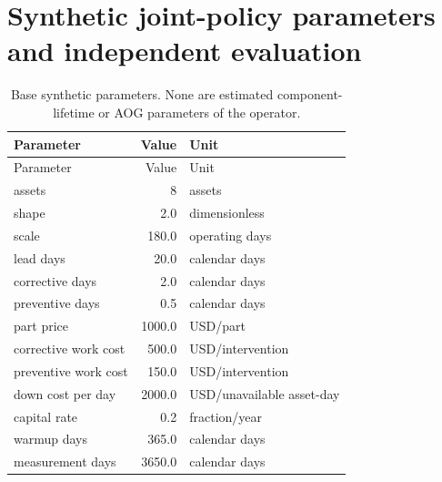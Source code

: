 \section{Synthetic joint-policy parameters and independent evaluation}

\begin{small}

\setlength{\tabcolsep}{4pt}

\begin{longtable}{lrl}

\caption{Base synthetic parameters. None are estimated component-lifetime or AOG parameters of the operator.}\label{tab:s-joint-parameters}\\

\toprule

Parameter & Value & Unit \\

\midrule

\endfirsthead

\toprule

Parameter & Value & Unit \\

\midrule

\endhead

assets & 8 & assets \\

shape & 2.0 & dimensionless \\

scale & 180.0 & operating days \\

lead days & 20.0 & calendar days \\

corrective days & 2.0 & calendar days \\

preventive days & 0.5 & calendar days \\

part price & 1000.0 & USD/part \\

corrective work cost & 500.0 & USD/intervention \\

preventive work cost & 150.0 & USD/intervention \\

down cost per day & 2000.0 & USD/unavailable asset-day \\

capital rate & 0.2 & fraction/year \\

warmup days & 365.0 & calendar days \\

measurement days & 3650.0 & calendar days \\

\bottomrule

\end{longtable}

\end{small}


